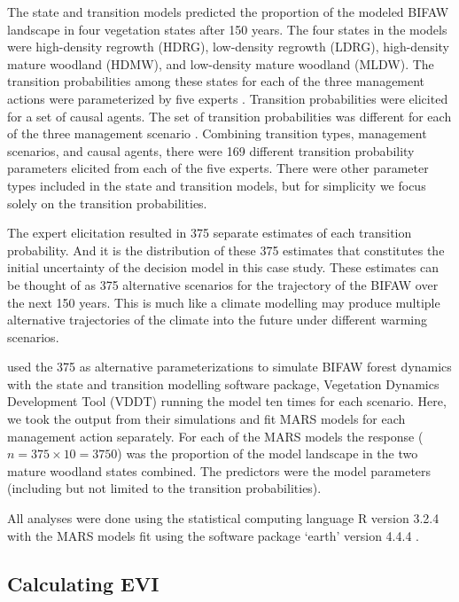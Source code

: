 \documentclass[]{article}
\begin{document}
The state and transition models predicted the proportion of the modeled
BIFAW landscape in four vegetation states after 150 years. The four
states in the models were high-density regrowth (HDRG), low-density
regrowth (LDRG), high-density mature woodland (HDMW), and low-density
mature woodland (MLDW). The transition probabilities among these states
for each of the three management actions were parameterized by five
experts \citep{Czembor2009}. Transition probabilities were elicited for
a set of causal agents. The set of transition probabilities was
different for each of the three management scenario \citep[see Table 1
in][]{Czembor2009}. Combining transition types, management scenarios,
and causal agents, there were 169 different transition probability
parameters elicited from each of the five experts. There were other
parameter types included in the state and transition models, but for
simplicity we focus solely on the transition probabilities.

The expert elicitation resulted in 375 separate estimates of each
transition probability. And it is the distribution of these 375
estimates that constitutes the initial uncertainty of the decision model
in this case study. These estimates can be thought of as 375 alternative
scenarios for the trajectory of the BIFAW over the next 150 years. This
is much like a climate modelling may produce multiple alternative
trajectories of the climate into the future under different warming
scenarios.

\citet{Czembor2011} used the 375 as alternative parameterizations to
simulate BIFAW forest dynamics with the state and transition modelling
software package, Vegetation Dynamics Development Tool (VDDT)
\citep{ESSA2007} running the model ten times for each scenario. Here, we
took the output from their simulations and fit MARS models for each
management action separately. For each of the MARS models the response
(\(n=375\times10=3750\)) was the proportion of the model landscape in
the two mature woodland states combined. The predictors were the model
parameters (including but not limited to the transition probabilities).

All analyses were done using the statistical computing language R
version 3.2.4 \citep{R2015} with the MARS models fit using the software
package `earth' version 4.4.4 \citep{Milborrow2013}.

\subsection{Calculating EVI}\label{calculating-evi}
\end{document}
